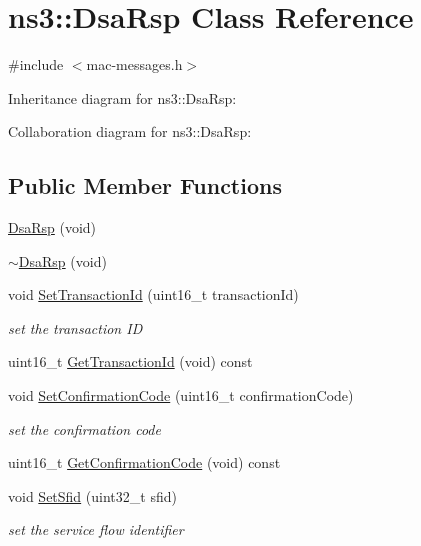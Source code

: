 \hypertarget{classns3_1_1DsaRsp}{}\section{ns3\+:\+:Dsa\+Rsp Class Reference}
\label{classns3_1_1DsaRsp}


{\ttfamily \#include $<$mac-\/messages.\+h$>$}



Inheritance diagram for ns3\+:\+:Dsa\+Rsp\+:


Collaboration diagram for ns3\+:\+:Dsa\+Rsp\+:
\subsection*{Public Member Functions}
\begin{DoxyCompactItemize}
\item 
\hyperlink{classns3_1_1DsaRsp_a1c7fda14066a0f2df3c92f158537f5c6}{Dsa\+Rsp} (void)
\item 
\hyperlink{classns3_1_1DsaRsp_a8eaaa85e847633b7fa1cc17453e12797}{$\sim$\+Dsa\+Rsp} (void)
\item 
void \hyperlink{classns3_1_1DsaRsp_aaaf2e9368b4cc5a87fb8691c9851cfec}{Set\+Transaction\+Id} (uint16\+\_\+t transaction\+Id)
\begin{DoxyCompactList}\small\item\em set the transaction ID \end{DoxyCompactList}\item 
uint16\+\_\+t \hyperlink{classns3_1_1DsaRsp_a02b87e30ad7f8c6ebd5c3c354624c97e}{Get\+Transaction\+Id} (void) const 
\item 
void \hyperlink{classns3_1_1DsaRsp_a0099d538e57a4bf95f739300635d0da1}{Set\+Confirmation\+Code} (uint16\+\_\+t confirmation\+Code)
\begin{DoxyCompactList}\small\item\em set the confirmation code \end{DoxyCompactList}\item 
uint16\+\_\+t \hyperlink{classns3_1_1DsaRsp_a376dbaf9b9728de6796cfd957e1a2ee1}{Get\+Confirmation\+Code} (void) const 
\item 
void \hyperlink{classns3_1_1DsaRsp_a55f3c643a3af901e58503976ec85cd10}{Set\+Sfid} (uint32\+\_\+t sfid)
\begin{DoxyCompactList}\small\item\em set the service flow identifier \end{DoxyCompactList}\item 

\end{DoxyCompactItemize}
